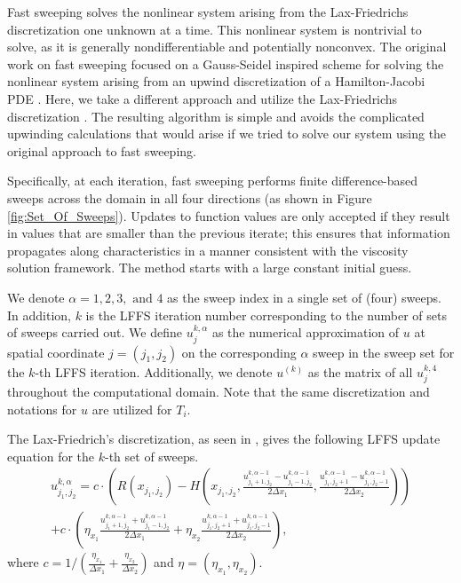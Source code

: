 \documentclass[pdflatex,sn-mathphys-num]{sn-jnl}%
\theoremstyle{thmstyleone}%
\theoremstyle{thmstyletwo}%
\theoremstyle{thmstylethree}%
\begin{document}
Fast sweeping solves the nonlinear system arising from the Lax-Friedrichs discretization one unknown at a time.  This nonlinear system is nontrivial to solve, as it is generally nondifferentiable and potentially nonconvex.  The original work on fast sweeping focused on a Gauss-Seidel inspired scheme for solving the nonlinear system arising from an upwind discretization of a Hamilton-Jacobi PDE \cite{Rouy1992, Boue1999, Tsai2003}.  Here, we take a different approach and utilize the Lax-Friedrichs discretization \cite{Zhao2004, Kao2005}.  The resulting algorithm is simple and avoids the complicated upwinding calculations that would arise if we tried to solve our system using the original approach to fast sweeping.  


Specifically, at each iteration, fast sweeping performs finite difference-based sweeps across the domain in all four directions (as shown in Figure \ref{fig:Set_Of_Sweeps}).  Updates to function values are only accepted if they result in values that are smaller than the previous iterate; this ensures that information propagates along characteristics in a manner consistent with the viscosity solution framework.  The method starts with a large constant initial guess.   


We denote $\alpha=1,2,3, \text{ and } 4$ as the sweep index in a single set of (four) sweeps. In addition, $k$ is the LFFS iteration number corresponding to the number of sets of sweeps carried out.  We define $u^{k,\alpha}_j$ as the numerical approximation of $u$ at spatial coordinate $j=(j_1,j_2)$ on the corresponding $\alpha$ sweep in the sweep set for the $k$-th LFFS iteration.  Additionally, we denote $u^{(k)}$ as the matrix of all $u^{k,4}_j$ throughout the computational domain.  Note that the same discretization and notations for $u$ are utilized for $T_i$.

The Lax-Friedrich's discretization, as seen in \cite{Kao2004}, gives the following LFFS update equation for the $k$-th set of sweeps.
\begin{align}
    u_{j_1,j_2}^{k,\alpha} = c \cdot
    \left(R(x_{j_1,j_2}) - H \left(x_{j_1,j_2}, \frac{u_{j_1+1,j_2}^{k,\alpha-1} - u_{j_1-1,j_2}^{k,\alpha-1}}{2 \Delta x_1},\frac{u_{j_1,j_2+1}^{k,\alpha-1} - u_{j_1,j_2-1}^{k,\alpha-1}}{2 \Delta x_2} \right) \right) \nonumber \\ + c \cdot \left( \eta_{x_1}\frac{u_{j_1+1,j_2}^{k,\alpha-1} + u_{j_1-1,j_2}^{k,\alpha-1}}{2 \Delta x_1} +\eta_{x_2}\frac{u_{j_1,j_2+1}^{k,\alpha-1} + u_{j_1,j_2-1}^{k,\alpha-1}}{2 \Delta x_2} \right),
    \label{eqn:LFFS_interior}
\end{align}
where $c = 1 / \left({\frac{\eta_{x_1}}{\Delta x_1}+\frac{\eta_{x_2}}{\Delta x_2}}\right)$ and $\eta=(\eta_{x_1},\eta_{x_2})$.  
\end{document}
